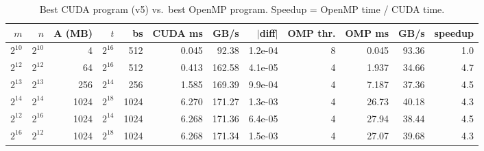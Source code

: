 \begin{table}[H]\centering\scriptsize\setlength{\tabcolsep}{3pt}
\caption{Best CUDA program (v5) vs.\ best OpenMP program. Speedup = OpenMP time / CUDA time.}\label{tab:q2compare}
\begin{tabular}{rrr|rrrrr|rrr|r}\toprule
$m$ & $n$ & A (MB) & $t$ & bs & CUDA ms & GB/s & $|$diff$|$ & OMP thr. & OMP ms & GB/s & speedup \\\midrule
$2^{10}$ & $2^{10}$ & 4 & $2^{16}$ & 512 & 0.045 & 92.38 & 1.2e-04 & 8 & 0.045 & 93.36 & 1.0 \\
$2^{12}$ & $2^{12}$ & 64 & $2^{16}$ & 512 & 0.413 & 162.58 & 4.1e-05 & 4 & 1.937 & 34.66 & 4.7 \\
$2^{13}$ & $2^{13}$ & 256 & $2^{14}$ & 256 & 1.585 & 169.39 & 9.9e-04 & 4 & 7.187 & 37.36 & 4.5 \\
$2^{14}$ & $2^{14}$ & 1024 & $2^{18}$ & 1024 & 6.270 & 171.27 & 1.3e-03 & 4 & 26.73 & 40.18 & 4.3 \\
$2^{12}$ & $2^{16}$ & 1024 & $2^{14}$ & 1024 & 6.268 & 171.36 & 6.4e-05 & 4 & 27.94 & 38.44 & 4.5 \\
$2^{16}$ & $2^{12}$ & 1024 & $2^{18}$ & 1024 & 6.268 & 171.34 & 1.5e-03 & 4 & 27.07 & 39.68 & 4.3 \\
\bottomrule\end{tabular}\end{table}
